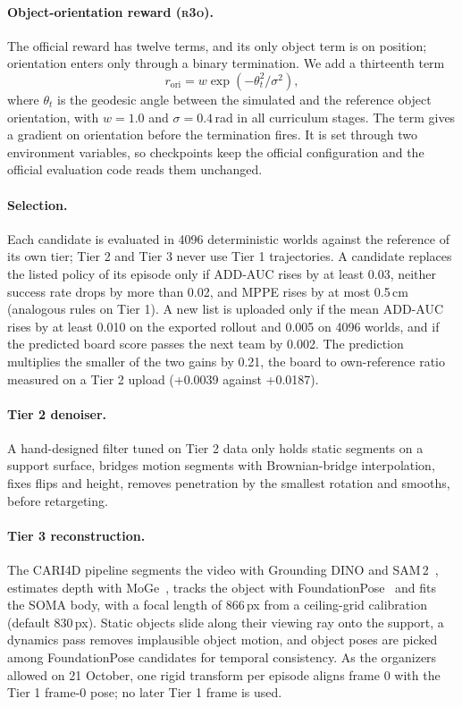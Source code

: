 \documentclass[10pt]{nvidiaextabstract}
\newcommand{\rtho}{\textsc{r3o}\xspace}
\begin{document}
\paragraph{Object-orientation reward (\rtho).}
The official reward has twelve terms, and its only object term is on position; orientation enters only through a binary termination.
We add a thirteenth term
\begin{equation}
\label{eq:ori}
r_{\mathrm{ori}} = w \exp\!\left(-\theta_t^2 / \sigma^2\right),
\end{equation}
where $\theta_t$ is the geodesic angle between the simulated and the reference object orientation, with $w=1.0$ and $\sigma=0.4$\,rad in all curriculum stages.
The term gives a gradient on orientation before the termination fires.
It is set through two environment variables, so checkpoints keep the official configuration and the official evaluation code reads them unchanged.

\paragraph{Selection.}
Each candidate is evaluated in 4096 deterministic worlds against the reference of its own tier; Tier 2 and Tier 3 never use Tier 1 trajectories.
A candidate replaces the listed policy of its episode only if ADD-AUC rises by at least 0.03, neither success rate drops by more than 0.02, and MPPE rises by at most 0.5\,cm (analogous rules on Tier 1).
A new list is uploaded only if the mean ADD-AUC rises by at least 0.010 on the exported rollout and 0.005 on 4096 worlds, and if the predicted board score passes the next team by 0.002.
The prediction multiplies the smaller of the two gains by 0.21, the board to own-reference ratio measured on a Tier 2 upload (+0.0039 against +0.0187).

\paragraph{Tier 2 denoiser.}
A hand-designed filter tuned on Tier 2 data only holds static segments on a support surface, bridges motion segments with Brownian-bridge interpolation, fixes flips and height, removes penetration by the smallest rotation and smooths, before retargeting.

\paragraph{Tier 3 reconstruction.}
The CARI4D pipeline segments the video with Grounding DINO and SAM\,2~\cite{liu2024groundingdino,ravi2024sam2}, estimates depth with MoGe~\cite{wang2025moge}, tracks the object with FoundationPose~\cite{wen2024foundationpose} and fits the SOMA body, with a focal length of 866\,px from a ceiling-grid calibration (default 830\,px).
Static objects slide along their viewing ray onto the support, a dynamics pass removes implausible object motion, and object poses are picked among FoundationPose candidates for temporal consistency.
As the organizers allowed on 21 October, one rigid transform per episode aligns frame 0 with the Tier 1 frame-0 pose; no later Tier 1 frame is used.
\end{document}
